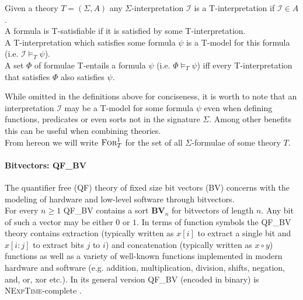 \begin{definition}
Given a theory $T=\left(\Sigma,A\right)$ any $\Sigma$-interpretation $\mathcal{I}$ is a T-interpretation if $\mathcal{I}\in A$.\\
A formula is T-satisfiable if it is satisfied by some T-interpretation.\\
A T-interpretation which satisfies some formula $\psi$ is a T-model for this formula (i.e. $\mathcal{I}\vDash_T\psi$).\\
A set $\Phi$ of formulae T-entails a formula $\psi$ (i.e. $\Phi\vDash_T\psi$) iff every T-interpretation that satisfies $\Phi$ also satisfies $\psi$.
\end{definition}
While omitted in the definitions above for conciseness, it is worth to note that an interpretation $\mathcal{I}$ may be a T-model for some formula $\psi$ even when defining functions, predicates or even sorts not in the signature $\Sigma$. Among other benefits this can be useful when combining theories.\\
From hereon we will write $\textsc{For}^1_T$ for the set of all $\Sigma$-formulae of some theory $T$.

\paragraph{Bitvectors: QF\_BV}
The quantifier free (QF) theory of fixed size bit vectors (BV) concerns with the modeling of hardware and low-level software through bitvectors.\\
For every $n\geq1$ QF\_BV contains a sort $\mathbf{BV}_n$ for bitvectors of length $n$. Any bit of such a vector may be either $0$ or $1$.
In terms of function symbols the QF\_BV theory contains extraction (typically written as $x[i]$ to extract a single bit and $x[i\colon j]$ to extract bits $j$ to $i$) and concatenation (typically written as $x\circ y$) functions as well as a variety of well-known functions implemented in modern hardware and software (e.g. addition, multiplication, division, shifts, negation, and, or, xor etc.). In its general version QF\_BV (encoded in binary) is \textsc{NExpTime}-complete \cite{KovasznaiFroehlichBiere-SMT12}.


